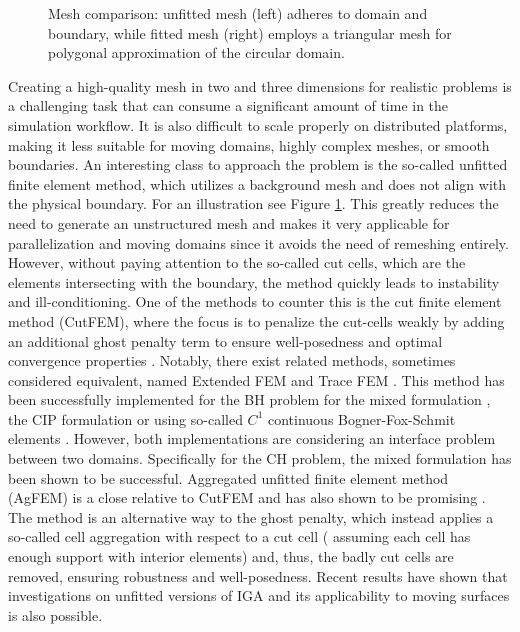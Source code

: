 \documentclass[11pt]{article}
\theoremstyle{remark}
\numberwithin{equation}{section}
\begin{document}
\begin{figure}[h!]
\begin{minipage}{0.45\textwidth}
    \end{minipage}
\caption{Mesh comparison: unfitted mesh (left) adheres to domain and boundary, while fitted mesh (right) employs a triangular mesh for polygonal approximation of the circular domain.}
\label{fig:domain_mesh}
\end{figure}

Creating a high-quality mesh in two and three dimensions for realistic problems is a challenging task that can consume a significant amount of time in the simulation workflow. It is also difficult to scale properly on distributed platforms, making it less suitable for moving domains, highly complex meshes, or smooth boundaries. An interesting class to approach the problem is the so-called unfitted finite element method, which utilizes a background mesh and does not align with the physical boundary. For an illustration
see Figure \ref{fig:domain_mesh}.
This greatly reduces the need to generate an unstructured mesh and makes it very applicable for parallelization and moving domains
since it avoids the need of remeshing entirely. However, without paying attention to the so-called cut cells, which are the elements intersecting with the boundary, the method quickly leads to instability and ill-conditioning.
One of the methods to counter this is the cut finite element method (CutFEM), where the focus is to penalize the cut-cells weakly by adding an additional ghost penalty term to ensure well-posedness and optimal convergence properties \cite{burman2015cutfem}. Notably, there exist related methods, sometimes considered equivalent, named Extended FEM and Trace FEM \cite{cai2021nitsche,zonca2018unfitted}.
This method has been successfully implemented for the BH problem for the
mixed formulation \cite{cai2023nitsche}, the CIP formulation \cite{chen2023arbitrary, cai2021nitsche} or using so-called $C^{1}$ continuous Bogner-Fox-Schmit elements \cite{burman2020cut}.
However, both implementations are considering an interface problem between two domains. Specifically for the CH problem, the mixed formulation \cite{karatzas2021reduced} has been shown to be successful.
 Aggregated unfitted finite element method (AgFEM) is a close relative to CutFEM and has also shown to
be promising \cite{badia2018aggregated, badia2022linking}. The method is an alternative way to the ghost penalty, which instead applies a so-called cell aggregation with respect to a cut cell ( assuming each cell has enough support with interior elements) and,
thus, the badly cut cells are removed, ensuring robustness and well-posedness.
Recent results have shown that investigations on unfitted versions of IGA
\cite{zhao2017variational} and its applicability to moving surfaces \cite{zimmermann2019isogeometric} is also possible.
\end{document}
